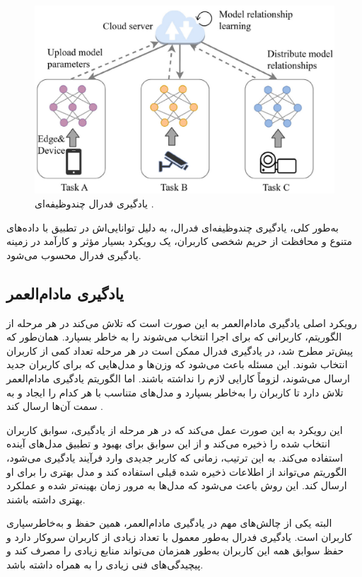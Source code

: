 \begin{figure}[t]
	\centering
	\includegraphics[scale=0.9]{images/chap3/multi_tasking.png}%
	\caption{%
		یادگیری فدرال چندوظیفه‌ای
		\cite{ma2022state}%
		.
	}
	\label{multi_tasking}
	\centering
\end{figure}


به‌طور کلی، یادگیری چندوظیفه‌ای فدرال، به دلیل توانایی‌اش در تطبیق با داده‌های متنوع و محافظت از حریم شخصی کاربران، یک رویکرد بسیار مؤثر و کارآمد در زمینه یادگیری فدرال محسوب می‌شود.


\subsection{
	یادگیری مادام‌العمر%
}
رویکرد اصلی یادگیری مادام‌العمر به این صورت است که تلاش می‌کند در هر مرحله از الگوریتم، کاربرانی که برای اجرا انتخاب می‌شوند را به خاطر بسپارد. همان‌طور که پیش‌تر مطرح شد، در یادگیری فدرال ممکن است در هر مرحله تعداد کمی از کاربران انتخاب شوند. این مسئله باعث می‌شود که وزن‌ها و مدل‌هایی که برای کاربران جدید ارسال می‌شوند، لزوماً کارایی لازم را نداشته باشند. اما الگوریتم یادگیری مادام‌العمر تلاش دارد تا کاربران را به‌خاطر بسپارد و مدل‌های متناسب با هر کدام را ایجاد و به سمت آن‌ها ارسال کند
\cite{shoham2019overcoming}.

این رویکرد به این صورت عمل می‌کند که در هر مرحله از یادگیری، سوابق کاربران انتخاب شده را ذخیره می‌کند و از این سوابق برای بهبود و تطبیق مدل‌های آینده استفاده می‌کند. به این ترتیب، زمانی که کاربر جدیدی وارد فرآیند یادگیری می‌شود، الگوریتم می‌تواند از اطلاعات ذخیره شده قبلی استفاده کند و مدل بهتری را برای او ارسال کند. این روش باعث می‌شود که مدل‌ها به مرور زمان بهینه‌تر شده و عملکرد بهتری داشته باشند.

البته یکی از چالش‌های مهم در یادگیری مادام‌العمر، همین حفظ و به‌خاطرسپاری کاربران است. یادگیری فدرال به‌طور معمول با تعداد زیادی از کاربران سروکار دارد و حفظ سوابق همه این کاربران به‌طور همزمان می‌تواند منابع زیادی را مصرف کند و پیچیدگی‌های فنی زیادی را به همراه داشته باشد.

